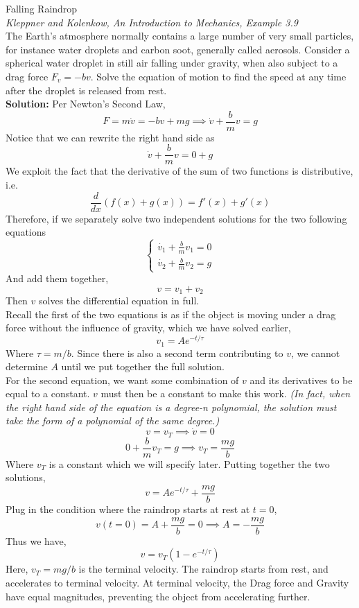 \documentclass[11pt]{article}
\theoremstyle{gangnamstyle}{\newtheorem{definition}{Definition}[]}
\theoremstyle{gangnamstyle}{\newtheorem{example}{Example}[]}
\theoremstyle{gangnamstyle}{\newtheorem{problem}{Problem}[]}
\theoremstyle{gangnamstyle}{\newtheorem{warning}{Warning}[]}
\begin{document}
\begin{example}
Falling Raindrop \\
\textit{Kleppner and Kolenkow, An Introduction to Mechanics, Example 3.9} \\
The Earth’s atmosphere normally contains a large number of very small particles, for instance water droplets and carbon soot, generally called aerosols. Consider a spherical water droplet in still air falling under gravity, when also subject to a drag force $F_v = -bv$. Solve the equation of motion to find the speed at any time after the droplet is released from rest. \\

\textbf{Solution:} Per Newton's Second Law, 
\[ F = m\Dot{v} = -bv + mg \implies \Dot{v} + \frac{b}{m}v = g \]
Notice that we can rewrite the right hand side as
\[ \Dot{v} + \frac{b}{m}v = 0 + g \]
We exploit the fact that the derivative of the sum of two functions is distributive, i.e.
\[ \frac{d}{dx}(f(x) + g(x)) = f'(x) + g'(x) \]
Therefore, if we separately solve two independent solutions for the two following equations
\[ \begin{cases}
\Dot{v_1} + \frac{b}{m}v_1 = 0 \\
\Dot{v_2} + \frac{b}{m}v_2 = g
\end{cases}\]
And add them together, 
\[ v = v_1 + v_2 \]
Then $v$ solves the differential equation in full. \\
Recall the first of the two equations is as if the object is moving under a drag force without the influence of gravity, which we have solved earlier, 
\[ v_1 = Ae^{-t/\tau} \]
Where $\tau = m/b$. Since there is also a second term contributing to $v$, we cannot determine $A$ until we put together the full solution. \\
For the second equation, we want some combination of $v$ and its derivatives to be equal to a constant. $v$ must then be a constant to make this work. \textit{(In fact, when the right hand side of the equation is a degree-n polynomial, the solution must take the form of a polynomial of the same degree.)}
\[ v = v_T \implies \Dot{v} = 0 \]
\[ 0 + \frac{b}{m}v_T = g \implies v_T = \frac{mg}{b} \]
Where $v_T$ is a constant which we will specify later. Putting together the two solutions, 
\[ v = Ae^{-t/\tau} + \frac{mg}{b} \]
Plug in the condition where the raindrop starts at rest at $t = 0$, 
\[ v(t = 0)  = A + \frac{mg}{b} = 0 \implies A = -\frac{mg}{b} \]
Thus we have, 
\[ v = v_T(1 - e^{-t/\tau}) \]
Here, $v_T = mg/b$ is the terminal velocity. The raindrop starts from rest, and accelerates to terminal velocity. At terminal velocity, the Drag force and Gravity have equal magnitudes, preventing the object from accelerating further. 
\end{example}
\end{document}
